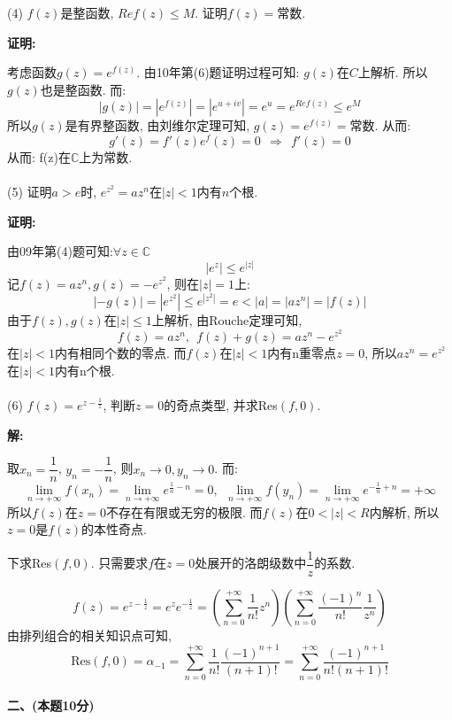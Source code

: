 \documentclass{article}
\begin{document}
(4) $f(z)$是整函数, $Re f(z) \leq M$. 证明$f(z) = $常数. 

\textbf{证明:}  

考虑函数$g(z) = e^{f(z)}$. 由10年第(6)题证明过程可知: $g(z)$在$C$上解析. 所以$g(z)$也是整函数. 而:
$$ |g(z)| = |e^{f(z)}| = |e^{u+iv}| = e^u = e^{Re f(z)} \leq e^M $$
所以$g(z)$是有界整函数, 由刘维尔定理可知, $g(z) = e^{f(z)} = $常数. 从而:
$$ g'(z) = f'(z)e^f(z) = 0 \ \ \Rightarrow \ \ f'(z) = 0 $$ 
从而: f(z)在$\mathbb{C}$上为常数. \\  \\



(5) 证明$a>e$时, $e^{z^2} = az^n$在$|z|<1$内有$n$个根. 

\textbf{证明:}

由09年第(4)题可知:$\forall z \in \mathbb{C}$
$$ |e^z| \leq e^{|z|} $$
记$f(z) = az^n, g(z) = -e^{z^2}$, 则在$|z| = 1$上:
$$ |-g(z)| = |e^{z^2}| \leq e^{|z^2|}  = e < |a| = |az^n| = |f(z)|$$
由于$f(z), g(z)$在$|z|\leq 1$上解析, 由Rouche定理可知, 
$$ f(z)=az^n, \ \ f(z) + g(z) = az^n - e^{z^2} $$
在$|z|<1$内有相同个数的零点. 而$f(z)$在$|z|<1$内有n重零点$z=0$, 所以$az^n = e^{z^2}$在$|z|<1$内有n个根.\\  \\ 

(6) $f(z) = e^{z-\frac{1}{z}} $, 判断$z=0$的奇点类型, 并求Res$(f,0)$.


\textbf{解:} 

取$x_n = \dfrac{1}{n} $, $y_n = -\dfrac{1}{n}$, 则$x_n \rightarrow 0, y_n \rightarrow 0$. 而:
$$ \lim\limits_{n \rightarrow +\infty} f(x_n) = \lim\limits_{n \rightarrow +\infty} e^{\frac{1}{n}-n} = 0, \ \ \lim\limits_{n \rightarrow +\infty} f(y_n) = \lim\limits_{n \rightarrow +\infty} e^{-\frac{1}{n}+n} = + \infty $$
所以$f(z)$在$z=0$不存在有限或无穷的极限. 而$f(z)$在$0<|z|<R$内解析, 所以$z=0$是$f(z)$的本性奇点.

下求Res$(f,0)$. 只需要求$f$在$z=0$处展开的洛朗级数中$\dfrac{1}{z}$的系数.

$$ f(z) = e^{z-\frac{1}{z}} = e^ze^{-\frac{1}{z}} = \left( \sum\limits_{n=0}^{+\infty} \dfrac{1}{n!} z^n \right)\left(\sum\limits_{n=0}^{+\infty} \dfrac{(-1)^n}{n!} \dfrac{1}{z^n}  \right) $$
由排列组合的相关知识点可知,
$$ \text{Res}(f, 0) = \alpha_{-1} = \sum\limits_{n=0}^{+\infty} \dfrac{1}{n!} \dfrac{(-1)^{n+1}}{(n+1)!} = \sum\limits_{n=0}^{+\infty} \dfrac{(-1)^{n+1}}{n!(n+1)!}  $$ \\ 

\textbf{二、(本题10分)}
\end{document}
